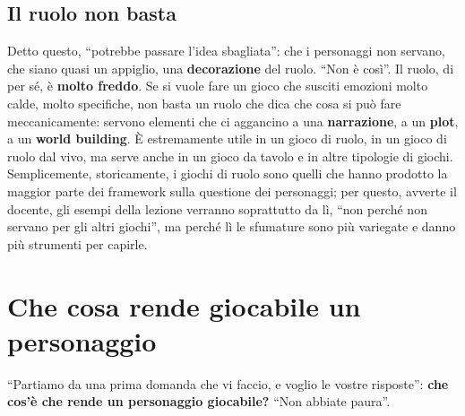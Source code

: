 \subsection{Il ruolo non basta}

Detto questo, ``potrebbe passare l'idea sbagliata'': che i personaggi non
servano, che siano quasi un appiglio, una \textbf{decorazione} del ruolo. ``Non è
così''. Il ruolo, di per sé, è \textbf{molto freddo}. Se si vuole fare un gioco che
susciti emozioni molto calde, molto specifiche, non basta un ruolo che dica che
cosa si può fare meccanicamente: servono elementi che ci aggancino a una
\textbf{narrazione}, a un \textbf{plot}, a un \textbf{world building}. È
estremamente utile in un gioco di ruolo, in un gioco di ruolo dal vivo, ma serve
anche in un gioco da tavolo e in altre tipologie di giochi. Semplicemente,
storicamente, i giochi di ruolo sono quelli che hanno prodotto la maggior parte
dei framework sulla questione dei personaggi; per questo, avverte il docente, gli
esempi della lezione verranno soprattutto da lì, ``non perché non servano per gli
altri giochi'', ma perché lì le sfumature sono più variegate e danno più strumenti
per capirle.

\section{Che cosa rende giocabile un personaggio}
\label{a4:sec:giocabile}

``Partiamo da una prima domanda che vi faccio, e voglio le vostre risposte'':
\textbf{che cos'è che rende un personaggio giocabile?} ``Non abbiate paura''.

